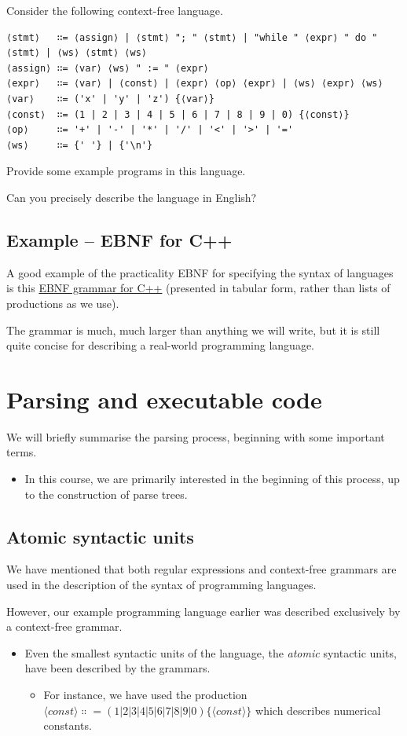 \documentclass[11pt]{article}
\theoremstyle{definition}
\begin{document}
Consider the following context-free language.
\begin{verbatim}
⟨stmt⟩   ∷= ⟨assign⟩ | ⟨stmt⟩ "; " ⟨stmt⟩ | "while " ⟨expr⟩ " do " ⟨stmt⟩ | ⟨ws⟩ ⟨stmt⟩ ⟨ws⟩
⟨assign⟩ ∷= ⟨var⟩ ⟨ws⟩ " := " ⟨expr⟩
⟨expr⟩   ∷= ⟨var⟩ | ⟨const⟩ | ⟨expr⟩ ⟨op⟩ ⟨expr⟩ | ⟨ws⟩ ⟨expr⟩ ⟨ws⟩
⟨var⟩    ∷= ('x' | 'y' | 'z') {⟨var⟩}
⟨const⟩  ∷= (1 | 2 | 3 | 4 | 5 | 6 | 7 | 8 | 9 | 0) {⟨const⟩}
⟨op⟩     ∷= '+' | '-' | '*' | '/' | '<' | '>' | '='
⟨ws⟩     ∷= {' '} | {'\n'}
\end{verbatim}

Provide some example programs in this language.

Can you precisely describe the language in English?

\subsection{Example – EBNF for C++}
\label{sec:org5ce1ef1}

A good example of the practicality EBNF for specifying
the syntax of languages is this
\href{http://www.externsoft.ch/download/cpp-iso.html}{EBNF grammar for C++}
(presented in tabular form, rather than lists of productions
as we use).

The grammar is much, much larger than anything we will write,
but it is still quite concise for describing
a real-world programming language.

\section{Parsing and executable code}
\label{sec:orgd99a722}

We will briefly summarise the parsing process,
beginning with some important terms.
\begin{itemize}
\item In this course, we are primarily interested in
the beginning of this process, up to the
construction of parse trees.
\end{itemize}

\subsection{Atomic syntactic units}
\label{sec:org1bcca59}

We have mentioned that both regular expressions and
context-free grammars are used in the description of
the syntax of programming languages.

However, our example programming language earlier
was described exclusively by a context-free grammar.
\begin{itemize}
\item Even the smallest syntactic units of the language,
the \emph{atomic} syntactic units, have been described by the grammars.
\begin{itemize}
\item For instance, we have used the production
\(⟨const⟩  ∷= (1 | 2 | 3 | 4 | 5 | 6 | 7 | 8 | 9 | 0) \{⟨const⟩\}\)
which describes numerical constants.
\end{itemize}
\end{itemize}
\end{document}
